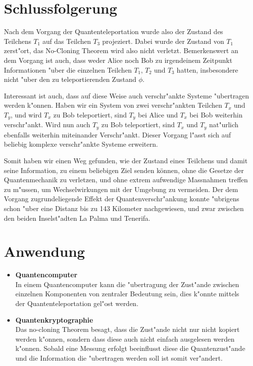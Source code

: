\begin{refsection}
\section{Schlussfolgerung}
Nach dem Vorgang der Quantenteleportation wurde also der Zustand des Teilchens $T_{1}$ auf das Teilchen $T_{3}$ projeziert. Dabei wurde der Zustand von $T_{1}$ zerst"ort, das No-Cloning Theorem wird also nicht verletzt. Bemerkenswert an dem Vorgang ist auch, dass weder Alice noch Bob zu irgendeinem Zeitpunkt Informationen "uber die einzelnen Teilchen $T_{1}$, $T_{2}$ und $T_{3}$ hatten, insbesondere nicht "uber den zu teleportierenden Zustand $\phi$. 

Interessant ist auch, dass auf diese Weise auch verschr"ankte Systeme "ubertragen werden k"onnen. Haben wir ein System von zwei verschr"ankten Teilchen $T_{x}$ und $T_{y}$, und wird $T_{x}$ zu Bob teleportiert, sind $T_{y}$ bei Alice und $T_{x}$ bei Bob weiterhin verschr"ankt. Wird nun auch $T_{y}$ zu Bob teleportiert, sind $T_{x}$ und $T_{y}$ nat"urlich ebenfalls weiterhin miteinander Verschr"ankt. Dieser Vorgang l"asst sich auf beliebig komplexe verschr"ankte Systeme erweitern. 

Somit haben wir einen Weg gefunden, wie der Zustand eines Teilchens und damit seine Information, zu einem beliebigen Ziel senden können, ohne die Gesetze der Quantenmechanik zu verletzen, und ohne extrem aufwendige Massnahmen treffen zu m"ussen, um Wechselwirkungen mit der Umgebung zu vermeiden. Der dem Vorgang zugrundeliegende Effekt der Quantenverschr"ankung konnte "ubrigens schon "uber eine Distanz bis zu 143 Kilometer nachgewiesen, und zwar zwischen den beiden Inselst"adten La Palma und Tenerifa.
\section{Anwendung}
	\begin{itemize}
		\item{\textbf{Quantencomputer} \\
			In einem Quantencomputer kann die "ubertragung der Zust"ande zwischen einzelnen Komponenten von zentraler Bedeutung sein, dies k"onnte mittels der Quantenteleportation gel"ost werden.
		}
		\item{\textbf{Quantenkryptographie} \\
			Das no-cloning Theorem besagt, dass die Zust"ande  nicht nur nicht kopiert werden k"onnen, sondern dass diese auch nicht einfach ausgelesen werden k"onnen. Sobald eine Messung erfolgt beeinflusst diese die Quantenzust"ande und die Information die "ubertragen werden soll ist somit ver"andert.
		}		
	\end{itemize}
\printbibliography[heading=subbibliography]
\end{refsection}